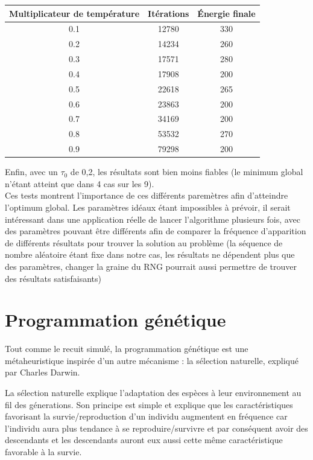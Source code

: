 \documentclass{report}
\begin{document}
\begin{tabular}{|c|c|c|}
 \hline
 Multiplicateur de temp\'erature & It\'erations & \'Energie finale \\
 \hline
 \hline
0.1  & 12780  & 330 \\
 \hline
0.2  & 14234  & 260 \\
 \hline
0.3  & 17571  & 280 \\
 \hline
0.4  & 17908  & 200 \\
 \hline
0.5  & 22618  & 265 \\
 \hline
0.6  & 23863  & 200 \\
 \hline
0.7  & 34169  & 200 \\
 \hline
0.8  & 53532  & 270 \\
 \hline
0.9  & 79298  & 200 \\
 \hline
\end{tabular}


Enfin, avec un  $\tau_{0}$ de 0,2, les r\'esultats sont bien moins fiables (le
minimum global n'\'etant atteint que dans 4 cas sur les 9).\\

Ces tests montrent l'importance de ces diff\'erents parem\`etres afin d'atteindre
l'optimum global. Les param\`etres id\'eaux \'etant impossibles \`a pr\'evoir,
il serait int\'eressant dans une application r\'eelle de lancer l'algorithme
plusieurs fois, avec des param\`etres pouvant \^etre diff\'erents afin de
comparer la fr\'equence d'apparition de diff\'erents r\'esultats pour trouver
la solution au probl\`eme (la s\'equence de nombre al\'eatoire \'etant fixe dans
notre cas, les r\'esultats ne d\'ependent plus que des param\`etres, changer la
graine du RNG pourrait aussi permettre de trouver des r\'esultats satisfaisants)\\

\section{Programmation génétique}

Tout comme le recuit simulé, la programmation génétique est une
métaheuristique inspirée d'un autre mécanisme : la sélection
naturelle, expliqué par Charles Darwin.

La sélection naturelle explique l'adaptation des espèces à leur
environnement au fil des génerations. Son principe est simple et
explique que les caractéristiques favorisant la survie/reproduction
d'un individu augmentent en fréquence car l'individu aura plus
tendance à se reproduire/survivre et par conséquent avoir des
descendants et les descendants auront eux aussi cette même
caractéristique favorable à la survie.\\\\
\end{document}
